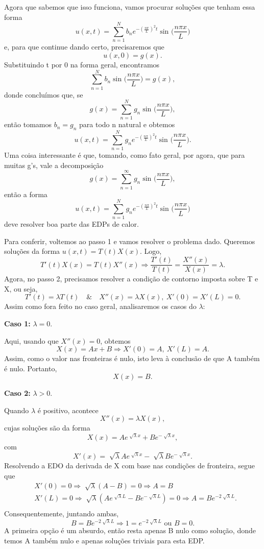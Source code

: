 \documentclass[../pde_notes.tex]{subfiles}
\begin{document}
\begin{example}
	Agora que sabemos que isso funciona, vamos procurar soluções que tenham essa forma
	\[
		u(x, t)=\sum\limits_{n=1}^{N}b_{n}e^{-\left(\frac{n\pi }{L}\right)^{2}t}\sin^{}{\biggl(\frac{n\pi x}{L}\biggr)}
	\]
	e, para que continue dando certo, precisaremos que
	\[
		u(x, 0) = g(x).
	\]
	Substituindo t por 0 na forma geral, encontramos
	\[
		\sum\limits_{n=1}^{N}b_{n}\sin^{}{\biggl(\frac{n\pi x}{L}\biggr)} = g(x),
	\]
	donde concluímos que, se
	\[
		g(x) = \sum\limits_{n=1}^{N}g_{n}\sin^{}{\biggl(\frac{n\pi x}{L}\biggr)},
	\]
	então tomamos \(b_{n} = g_{n}\) para todo n natural e obtemos
	\[
		u(x, t) = \sum\limits_{n=1}^{N}g_{n}e^{-\left(\frac{n\pi }{L}\right)^{2}t}\sin^{}{\biggl(\frac{n\pi x}{L}\biggr)}.
	\]
	Uma coisa interessante é que, tomando, como fato geral, por agora, que para muitas g's, vale a decomposição
	\[
		g(x) = \sum\limits_{n=1}^{\infty}g_{n}\sin^{}{\biggl(\frac{n\pi x}{L}\biggr)},
	\]
	então a forma
	\[
		u(x, t) = \sum\limits_{n=1}^{N}g_{n}e^{-\left(\frac{n\pi }{L}\right)^{2}t}\sin^{}{\biggl(\frac{n\pi x}{L}\biggr)}
	\]
	deve resolver boa parte das EDPs de calor.

	Para conferir, voltemos ao {\color{orange}passo 1} e vamos resolver o problema dado. Queremos soluções da forma \(u(x, t) = T(t)X(x)\). Logo,
	\[
		T'(t)X(x) = T(t)X''(x) \Rightarrow \frac{T'(t)}{T(t)} = \frac{X''(x)}{X(x)} = \lambda .
	\]
	Agora, no {\color{yellow}passo 2}, precisamos resolver a condição de contorno imposta sobre T e X, ou seja,
	\[
		T'(t)=\lambda T(t) \quad\&\quad X''(x)=\lambda X(x),\: X'(0)=X'(L)=0.
	\]
	Assim como fora feito no caso geral, analisaremos os casos do \(\lambda \):

	\textbf{Caso 1:} \(\lambda = 0\).

	Aqui, usando que \(X''(x)=0\), obtemos
	\[
		X(x)=Ax + B \Rightarrow X'(0)=A,\: X'(L)=A.
	\]
	Assim, como o valor nas fronteiras é nulo, isto leva à conclusão de que A também é nulo. Portanto,
	\[
		X(x)=B.
	\]

	\textbf{Caso 2:} \(\lambda > 0\).

	Quando \(\lambda \) é positivo, acontece
	\[
		X''(x)=\lambda X(x),
	\]
	cujas soluções são da forma
	\[
		X(x)=Ae^{\sqrt[]{\lambda }x} + Be^{-\sqrt[]{\lambda }x},
	\]
	com
	\[
		X'(x)=\sqrt[]{\lambda }Ae^{\sqrt[]{\lambda }x} - \sqrt[]{\lambda }Be^{-\sqrt[]{\lambda }x}.
	\]
	Resolvendo a EDO da derivada de X com base nas condições de fronteira, segue que
	\begin{align*}
		 & X'(0)=0 \Rightarrow \sqrt[]{\lambda }(A-B)=0 \Rightarrow A=B                                                                       \\
		 & X'(L)=0 \Rightarrow \sqrt[]{\lambda }(Ae^{\sqrt[]{\lambda }L}-Be^{-\sqrt[]{\lambda }L})=0 \Rightarrow A=Be^{-2\sqrt[]{\lambda }L}. \\
	\end{align*}
	Consequentemente, juntando ambas,
	\[
		B=Be^{-2\sqrt[]{\lambda }L} \Rightarrow 1=e^{-2\sqrt[]{\lambda }L} \text{ ou } B=0.
	\]
	A primeira opção é um absurdo, então resta apenas B nulo como solução, donde temos A também nulo e apenas soluções triviais para esta EDP.


\end{example}
\end{document}
